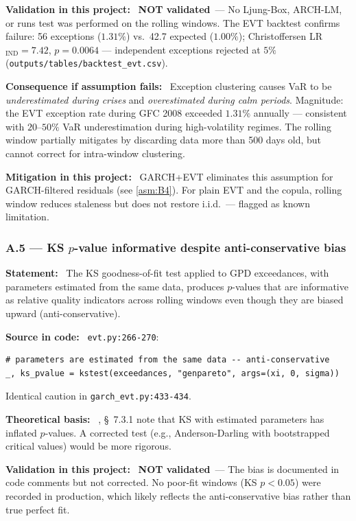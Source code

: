 \documentclass[11pt,a4paper]{article}
\newcommand{\asmfield}[1]{\medskip\noindent\textbf{#1:}\ }
\newcommand{\code}[1]{\texttt{#1}}
\newcommand{\notvalidated}{\textbf{NOT validated}}
\begin{document}
\asmfield{Validation in this project}
\notvalidated\ --- No Ljung-Box, ARCH-LM, or runs test was performed on
the rolling windows. The EVT backtest confirms failure: 56 exceptions
($1.31\%$) vs.\ 42.7 expected ($1.00\%$); Christoffersen LR$_{\mathrm{IND}}
= 7.42$, $p = 0.0064$ --- independent exceptions rejected at $5\%$
(\code{outputs/tables/backtest\_evt.csv}).

\asmfield{Consequence if assumption fails}
Exception clustering causes VaR to be \emph{underestimated during crises}
and \emph{overestimated during calm periods}. Magnitude: the EVT exception
rate during GFC 2008 exceeded $1.31\%$ annually --- consistent with
$20$--$50\%$ VaR underestimation during high-volatility regimes. The
rolling window partially mitigates by discarding data more than 500 days
old, but cannot correct for intra-window clustering.

\asmfield{Mitigation in this project}
GARCH+EVT eliminates this assumption for GARCH-filtered residuals (see
\cref{asm:B4}). For plain EVT and the copula, rolling window reduces
staleness but does not restore i.i.d.\ --- flagged as known limitation.

\subsubsection{A.5 --- KS $p$-value informative despite anti-conservative bias}\label{asm:A5}

\asmfield{Statement}
The KS goodness-of-fit test applied to GPD exceedances, with parameters
estimated from the same data, produces $p$-values that are informative as
relative quality indicators across rolling windows even though they are
biased upward (anti-conservative).

\asmfield{Source in code}
\code{evt.py:266-270}:
\begin{lstlisting}
# parameters are estimated from the same data -- anti-conservative
_, ks_pvalue = kstest(exceedances, "genpareto", args=(xi, 0, sigma))
\end{lstlisting}
Identical caution in \code{garch\_evt.py:433-434}.

\asmfield{Theoretical basis}
\cite{McNeilFreyEmbrechts2005}, \S~7.3.1 note that KS with estimated
parameters has inflated $p$-values. A corrected test (e.g., Anderson-Darling
with bootstrapped critical values) would be more rigorous.

\asmfield{Validation in this project}
\notvalidated\ --- The bias is documented in code comments but not corrected.
No poor-fit windows (KS $p < 0.05$) were recorded in production, which
likely reflects the anti-conservative bias rather than true perfect fit.
\end{document}
